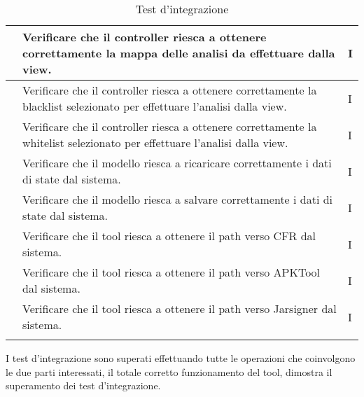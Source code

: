 \begin{longtable}{ |C{3cm} | C{8.5cm}| C{1.5cm} |}
     & Verificare che il controller riesca a ottenere correttamente la mappa delle analisi da effettuare dalla view.              & I \\\hline
     & Verificare che il controller riesca a ottenere correttamente la blacklist selezionato per effettuare l'analisi dalla view. & I \\\hline
     & Verificare che il controller riesca a ottenere correttamente la whitelist selezionato per effettuare l'analisi dalla view. & I \\\hline
     & Verificare che il modello riesca a ricaricare correttamente i dati di state dal sistema.                                   & I \\\hline
     & Verificare che il modello riesca a salvare correttamente i dati di state dal sistema.                                      & I \\\hline
     & Verificare che il tool riesca a ottenere il path verso CFR dal sistema.                                                    & I \\\hline
     & Verificare che il tool riesca a ottenere il path verso APKTool dal sistema.                                                & I \\\hline
     & Verificare che il tool riesca a ottenere il path verso Jarsigner dal sistema.                                              & I \\\hline
    \caption{Test d'integrazione}
\end{longtable}

I test d'integrazione sono superati effettuando tutte le operazioni che coinvolgono le due parti interessati, il totale corretto funzionamento del tool, dimostra il superamento dei test d'integrazione.
\setcounter{rowcount}{0}


